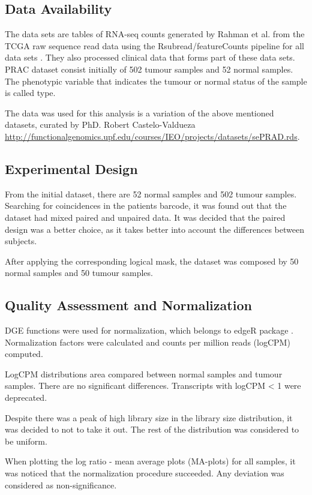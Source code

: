 \documentclass[9pt,twocolumn,twoside]{gsajnl}
\begin{document}
\subsection*{Data Availability}

The data sets are tables of RNA-seq counts generated by Rahman et al. \cite{Rahman15112015} from the TCGA raw sequence read data using the Rsubread/featureCounts pipeline for all data sets \cite{Rsubread}. They also processed clinical data that forms part of these data sets. PRAC dataset consist initially of 502 tumour samples and 52 normal samples. The phenotypic variable that indicates the tumour or normal status of the sample is called type.

The data was used for this analysis is a variation of the above mentioned datasets, curated by PhD. Robert Castelo-Valdueza \url{http://functionalgenomics.upf.edu/courses/IEO/projects/datasets/sePRAD.rds}.

\subsection*{Experimental Design}
From the initial dataset, there are 52 normal samples and 502 tumour samples. Searching for coincidences in the patients barcode, it was found out that the dataset had mixed paired and unpaired data. It was decided that the paired design was a better choice, as it takes better into account the differences between subjects.

After applying the corresponding logical mask, the dataset was composed by 50 normal samples and 50 tumour samples.

\subsection*{Quality Assessment and Normalization}
DGE functions were used for normalization, which belongs to edgeR package \cite{Robinson01012010}. Normalization factors were calculated and counts per million reads (logCPM) computed.

LogCPM distributions area compared between normal samples and tumour samples. There are no significant differences. Transcripts with logCPM < 1 were deprecated.

Despite there was a peak of high library size in the library size distribution, it was decided to not to take it out. The rest of the distribution was considered to be uniform.

When plotting the log ratio - mean average plots (MA-plots) for all samples, it was noticed that the normalization procedure succeeded. Any deviation was considered as non-significance.
\end{document}
